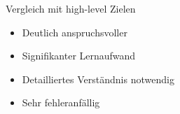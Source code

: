 \begin{frame}{Vergleich mit high-level Zielen}

	\begin{itemize}
		\item<1-> Deutlich anspruchsvoller
		\item<2-> Signifikanter Lernaufwand
		\item<3-> Detailliertes Verständnis notwendig
		\item<4-> Sehr fehleranfällig
	\end{itemize}
\end{frame}
